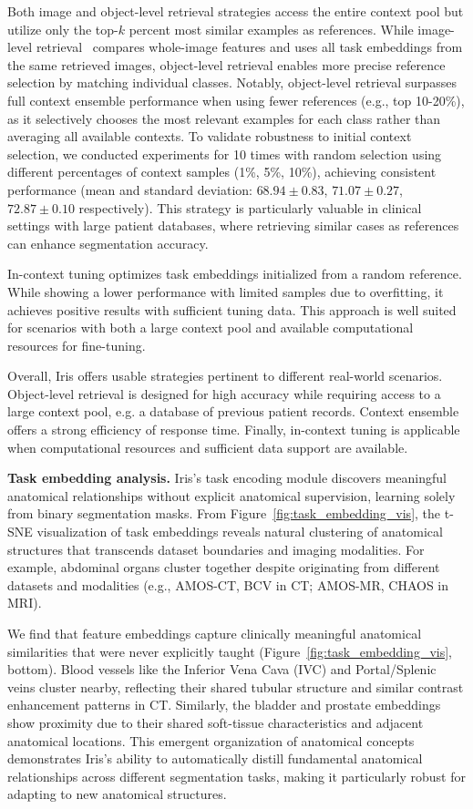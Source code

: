 Both image and object-level retrieval strategies access the entire context pool but utilize only the top-$k$ percent most similar examples as references. While image-level retrieval~\cite{zhang2023makes} compares whole-image features and uses all task embeddings from the same retrieved images, object-level retrieval enables more precise reference selection by matching individual classes. Notably, object-level retrieval surpasses full context ensemble performance when using fewer references (e.g., top 10-20\%), as it selectively chooses the most relevant examples for each class rather than averaging all available contexts. To validate robustness to initial context selection, we conducted experiments for 10 times with random selection using different percentages of context samples (1\%, 5\%, 10\%), achieving consistent performance (mean and standard deviation: $68.94\pm 0.83$, $71.07\pm 0.27$, $72.87\pm 0.10$ respectively). This strategy is particularly valuable in clinical settings with large patient databases, where retrieving similar cases as references can enhance segmentation accuracy.

In-context tuning optimizes task embeddings initialized from a random reference. While showing a lower performance with limited samples due to overfitting, it achieves positive results with sufficient tuning data. This approach is well suited for scenarios with both a large context pool and available computational resources for fine-tuning.

Overall, Iris offers usable strategies pertinent to different real-world scenarios. Object-level retrieval is designed for high accuracy while requiring access to a large context pool, e.g. a database of previous patient records. Context ensemble offers a strong efficiency of response time. Finally, in-context tuning is applicable when computational resources and sufficient data support are available.


\noindent\textbf{Task embedding analysis.} Iris's task encoding module discovers meaningful anatomical relationships without explicit anatomical supervision, learning solely from binary segmentation masks. From Figure~\ref{fig:task_embedding_vis}, the t-SNE visualization of task embeddings reveals natural clustering of anatomical structures that transcends dataset boundaries and imaging modalities. For example, abdominal organs cluster together despite originating from different datasets and modalities (e.g., AMOS-CT, BCV in CT; AMOS-MR, CHAOS in MRI).

We find that feature embeddings capture clinically meaningful anatomical similarities that were never explicitly taught (Figure~\ref{fig:task_embedding_vis}, bottom). Blood vessels like the Inferior Vena Cava (IVC) and Portal/Splenic veins cluster nearby, reflecting their shared tubular structure and similar contrast enhancement patterns in CT. Similarly, the bladder and prostate embeddings show proximity due to their shared soft-tissue characteristics and adjacent anatomical locations. This emergent organization of anatomical concepts demonstrates Iris's ability to automatically distill fundamental anatomical relationships across different segmentation tasks, making it particularly robust for adapting to new anatomical structures.


